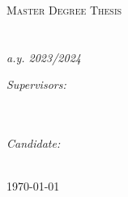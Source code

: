 
\begin{titlepage}
    \begin{center}

        {\scshape\LARGE \univname\par}\vspace{1.5cm} %
        \textsc{\Large Master Degree Thesis}\\[0.5cm] %
        \Large\deptname\\[0.5cm] %
        \Large\facname\\[0.5cm] %
        \textit{\normalsize a.y. 2023/2024} %

        \vfill
        \vfill

        {\huge \bfseries \ttitle\par}\vspace{0.4cm} %
        


        \vfill

        \begin{minipage}[t]{0.4\textwidth}
            \begin{flushleft} \large
                \emph{Supervisors:} \\[0.2cm]
                \supname\\[0.3cm] %
                \cosupname\\[0.3cm] %
                \cocosupname
            \end{flushleft}
        \end{minipage}
        \begin{minipage}[t]{0.4\textwidth}
            \begin{flushright} \large
                \emph{Candidate:}\\[0.2cm]
                \authorname %
            \end{flushright}
        \end{minipage}\\[1cm]

        {\large \monthyeardate\today}\\[4cm] %
        
    \end{center}
\end{titlepage}